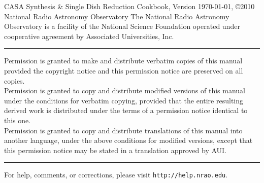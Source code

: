 \begin{center}
{\sc CASA Synthesis \& Single Dish Reduction Cookbook}, 
\break
Version \today,
\break
\copyright 2010 National Radio Astronomy Observatory
\break
\break
The National Radio Astronomy Observatory is a facility of the National
Science Foundation operated under cooperative agreement by Associated
Universities, Inc.\\[1cm]
\end{center}
\small
\hrule
\vspace{2mm}
\noindent Permission is granted to make and distribute verbatim
copies of this manual provided the copyright notice and this
permission notice are preserved on all copies. \\
\noindent Permission is granted to copy and distribute modified versions of this
manual under the conditions for verbatim copying, provided that the
entire resulting derived work is distributed under the terms of a
permission notice identical to this one. \\
\noindent Permission is granted to copy and distribute translations of
this manual into another language, under the above conditions for
modified versions, except that this permission notice may be stated in
a translation approved by AUI.\\[1cm]
\hrule
\vspace{2mm}
\normalsize
For help, comments, or corrections, please visit {\verb=http://help.nrao.edu=}.
\normalsize
%
%



\pagebreak